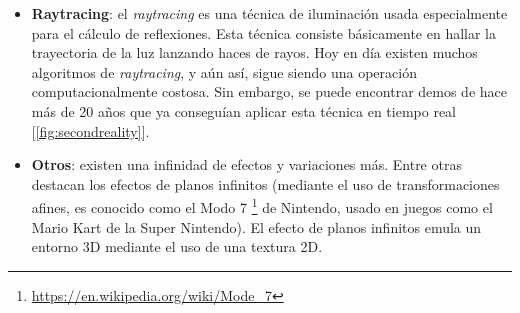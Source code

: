 \begin{itemize}
	\item \textbf{Raytracing}: el \emph{raytracing} es una técnica de iluminación usada especialmente para el cálculo de reflexiones. Esta técnica consiste básicamente en hallar la trayectoria de la luz lanzando haces de rayos. Hoy en día existen muchos algoritmos de \emph{raytracing}, y aún así, sigue siendo una operación computacionalmente costosa. Sin embargo, se puede encontrar demos de hace más de 20 años que ya conseguían aplicar esta técnica en tiempo real [\ref{fig:secondreality}].
	\item \textbf{Otros}: existen una infinidad de efectos y variaciones más. Entre otras destacan los efectos de planos infinitos (mediante el uso de transformaciones afines, es conocido como el Modo 7 \footnote{\url{https://en.wikipedia.org/wiki/Mode_7}} de Nintendo, usado en juegos como el Mario Kart de la Super Nintendo). El efecto de planos infinitos emula un entorno 3D mediante el uso de una textura 2D.
\end{itemize}

